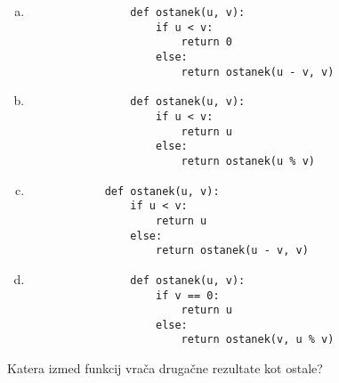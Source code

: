 \documentclass[arhiv, 10pt]{../izpit}
\begin{document}
        \begin{multicols}{2}
        \begin{enumerate}[(a)]
\item 
                \begin{verbatim}
                def ostanek(u, v):
                    if u < v:
                        return 0
                    else:
                        return ostanek(u - v, v)
                \end{verbatim}
            
\item 
                \begin{verbatim}
                def ostanek(u, v):
                    if u < v:
                        return u
                    else:
                        return ostanek(u % v)
                \end{verbatim}
            
\item 
            \begin{verbatim}
            def ostanek(u, v):
                if u < v:
                    return u
                else:
                    return ostanek(u - v, v)
            \end{verbatim}
        
\item 
                \begin{verbatim}
                def ostanek(u, v):
                    if v == 0:
                        return u
                    else:
                        return ostanek(v, u % v)
                \end{verbatim}
            
\end{enumerate}

        \end{multicols}
    
        \naloga*
        
        Katera izmed funkcij vrača drugačne rezultate kot ostale?
    
\end{document}
